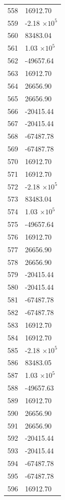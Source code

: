 \documentclass[a4paper,11pt]{article}
\begin{document}
\begin{center}
\begin{longtable}{|R{1.5cm}|R{2.6cm}|}
  558 &     16912.70 \\
  559 &        -2.18 $\times 10^{           5}$ \\
  560 &     83483.04 \\
  561 &         1.03 $\times 10^{           5}$ \\
  562 &    -49657.64 \\
  563 &     16912.70 \\
  564 &     26656.90 \\
  565 &     26656.90 \\
  566 &    -20415.44 \\
  567 &    -20415.44 \\
  568 &    -67487.78 \\
  569 &    -67487.78 \\
  570 &     16912.70 \\
  571 &     16912.70 \\
  572 &        -2.18 $\times 10^{           5}$ \\
  573 &     83483.04 \\
  574 &         1.03 $\times 10^{           5}$ \\
  575 &    -49657.64 \\
  576 &     16912.70 \\
  577 &     26656.90 \\
  578 &     26656.90 \\
  579 &    -20415.44 \\
  580 &    -20415.44 \\
  581 &    -67487.78 \\
  582 &    -67487.78 \\
  583 &     16912.70 \\
  584 &     16912.70 \\
  585 &        -2.18 $\times 10^{           5}$ \\
  586 &     83483.05 \\
  587 &         1.03 $\times 10^{           5}$ \\
  588 &    -49657.63 \\
  589 &     16912.70 \\
  590 &     26656.90 \\
  591 &     26656.90 \\
  592 &    -20415.44 \\
  593 &    -20415.44 \\
  594 &    -67487.78 \\
  595 &    -67487.78 \\
  596 &     16912.70 \\

\end{longtable}
\end{center}
\end{document}
